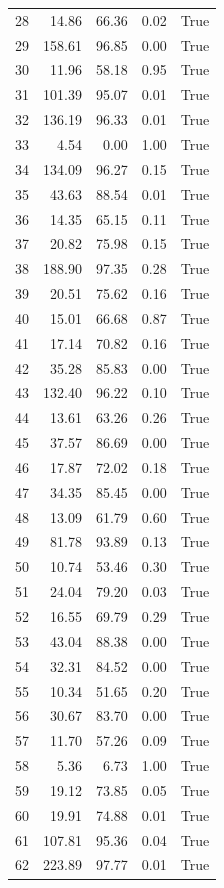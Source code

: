 \begin{longtable}{rrrrr}
28 & 14.86 & 66.36 & 0.02 & True \\
29 & 158.61 & 96.85 & 0.00 & True \\
30 & 11.96 & 58.18 & 0.95 & True \\
31 & 101.39 & 95.07 & 0.01 & True \\
32 & 136.19 & 96.33 & 0.01 & True \\
33 & 4.54 & 0.00 & 1.00 & True \\
34 & 134.09 & 96.27 & 0.15 & True \\
35 & 43.63 & 88.54 & 0.01 & True \\
36 & 14.35 & 65.15 & 0.11 & True \\
37 & 20.82 & 75.98 & 0.15 & True \\
38 & 188.90 & 97.35 & 0.28 & True \\
39 & 20.51 & 75.62 & 0.16 & True \\
40 & 15.01 & 66.68 & 0.87 & True \\
41 & 17.14 & 70.82 & 0.16 & True \\
42 & 35.28 & 85.83 & 0.00 & True \\
43 & 132.40 & 96.22 & 0.10 & True \\
44 & 13.61 & 63.26 & 0.26 & True \\
45 & 37.57 & 86.69 & 0.00 & True \\
46 & 17.87 & 72.02 & 0.18 & True \\
47 & 34.35 & 85.45 & 0.00 & True \\
48 & 13.09 & 61.79 & 0.60 & True \\
49 & 81.78 & 93.89 & 0.13 & True \\
50 & 10.74 & 53.46 & 0.30 & True \\
51 & 24.04 & 79.20 & 0.03 & True \\
52 & 16.55 & 69.79 & 0.29 & True \\
53 & 43.04 & 88.38 & 0.00 & True \\
54 & 32.31 & 84.52 & 0.00 & True \\
55 & 10.34 & 51.65 & 0.20 & True \\
56 & 30.67 & 83.70 & 0.00 & True \\
57 & 11.70 & 57.26 & 0.09 & True \\
58 & 5.36 & 6.73 & 1.00 & True \\
59 & 19.12 & 73.85 & 0.05 & True \\
60 & 19.91 & 74.88 & 0.01 & True \\
61 & 107.81 & 95.36 & 0.04 & True \\
62 & 223.89 & 97.77 & 0.01 & True \\

\end{longtable}
